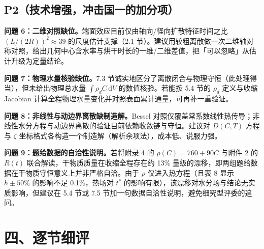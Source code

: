 \documentclass[12pt,a4paper]{ctexart}
\begin{document}
\subsection{P2（技术增强，冲击国一的加分项）}

\textbf{问题 6：二维对照缺位。}端面效应目前仅由轴向/径向扩散特征时间之比 $(L/(2R))^2\approx39$ 的尺度估计支撑（2.1 节）。建议用较粗离散做一次二维轴对称对照，给出几何中心含水率与烘干时长的一维/二维差值，把「可以忽略」从估计升级为定量结论。

\textbf{问题 7：物理水量核验缺位。}7.3 节诚实地区分了离散闭合与物理守恒（此处理得当），但未给出物理总水量 $\int\rho_d C\,\mathrm{d}V$ 的数值核验。若能按 5.4 节的 $\rho_d$ 定义与收缩 Jacobian 计算全程物理水量变化并对照表面累计通量，可再补一重验证。

\textbf{问题 8：非线性与动边界离散缺制造解。}Bessel 对照仅覆盖常系数线性热传导；非线性水分方程与动边界离散的验证目前依赖收敛链与守恒。建议对 $D(C,T)$ 方程与 $\zeta$ 坐标格式各构造一个制造解（解析余项法），成本低、说服力强。

\textbf{问题 9：题给数据的自洽性说明。}若将附录 4 的 $\rho(C)=760+90C$ 与附件 2 的 $R(t)$ 联合解读，干物质质量在收缩全程存在约 13\% 量级的漂移，即两组题给数据在干物质守恒意义上并非严格自洽。由于 $\rho$ 仅进入热方程（且表 8 显示 $h\pm50\%$ 的影响不足 0.1\%，热场对 $t^*$ 的影响有限），该漂移对水分场与结论无实质影响，但建议在 5.4 节或 7.5 节加一句数据自洽性说明，避免细究型评委的追问。

\section{四、逐节细评}
\end{document}
